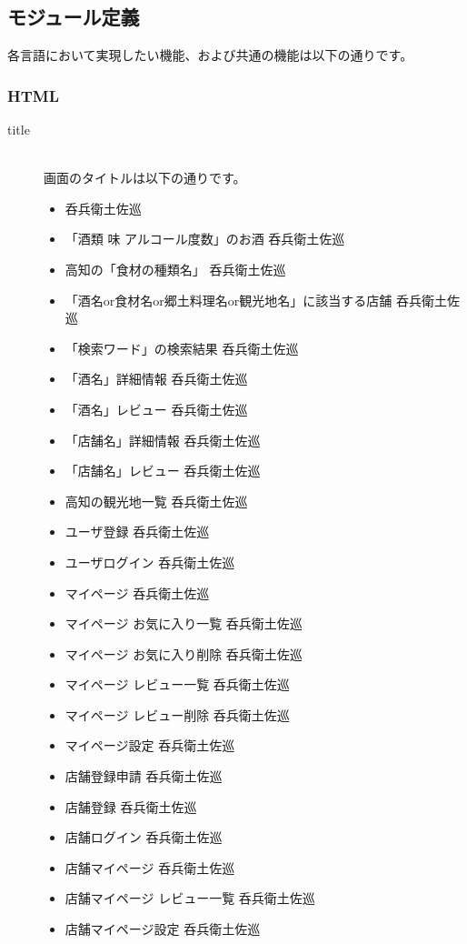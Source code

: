 \documentclass[a4j,titlepage]{jarticle}
\begin{document}
\clearpage

\subsection{モジュール定義}
各言語において実現したい機能、および共通の機能は以下の通りです。

\subsubsection{HTML}
\begin{description}
\item [title]~\\
画面のタイトルは以下の通りです。

\begin{itemize}
\item 呑兵衛土佐巡
\item 「酒類 味 アルコール度数」のお酒 呑兵衛土佐巡
\item 高知の「食材の種類名」 呑兵衛土佐巡
\item 「酒名or食材名or郷土料理名or観光地名」に該当する店舗 呑兵衛土佐巡
\item 「検索ワード」の検索結果 呑兵衛土佐巡
\item 「酒名」詳細情報 呑兵衛土佐巡
\item 「酒名」レビュー 呑兵衛土佐巡
\item 「店舗名」詳細情報 呑兵衛土佐巡
\item 「店舗名」レビュー 呑兵衛土佐巡
\item 高知の観光地一覧 呑兵衛土佐巡
\item ユーザ登録 呑兵衛土佐巡
\item ユーザログイン 呑兵衛土佐巡
\item マイページ 呑兵衛土佐巡
\item マイページ お気に入り一覧 呑兵衛土佐巡
\item マイページ お気に入り削除 呑兵衛土佐巡
\item マイページ レビュー一覧 呑兵衛土佐巡
\item マイページ レビュー削除 呑兵衛土佐巡
\item マイページ設定 呑兵衛土佐巡
\item 店舗登録申請 呑兵衛土佐巡
\item 店舗登録 呑兵衛土佐巡
\item 店舗ログイン 呑兵衛土佐巡
\item 店舗マイページ 呑兵衛土佐巡
\item 店舗マイページ レビュー一覧 呑兵衛土佐巡
\item 店舗マイページ設定 呑兵衛土佐巡
\end{itemize}

\end{description}
\end{document}
